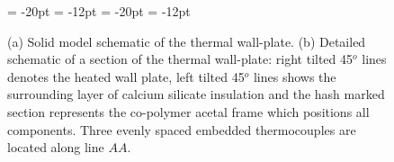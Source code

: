 \begin{figure}[h!]
  \begin{center}
  {\subfigcapskip = -20pt \subfigcapmargin = -12pt }
   {\subfigcapskip = -20pt \subfigcapmargin = -12pt  }
  \end{center}
 \caption{\label{fig:Virk_model} (a) Solid model schematic of the thermal wall-plate. (b) Detailed schematic of a section of the thermal wall-plate: right tilted 45$^o$ lines denotes the heated wall plate, left tilted 45$^o$ lines shows the surrounding layer of calcium silicate insulation and the hash marked section represents the co-polymer acetal frame which positions all components. Three evenly spaced embedded thermocouples are located along line $AA$.}  
\label{fig:wallplate}
\end{figure}

